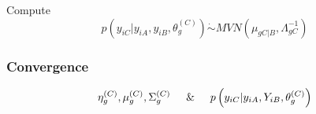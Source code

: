 \documentclass[a4paper,12pt]{article}\usepackage[]{graphicx}\usepackage[]{color}
\begin{document}
Compute
\[
p\left(y_{iC} | y_{iA}, y_{iB}, \theta_{g}^{\left(C \right)} \right) \dot{\sim} MVN\left(\mu_{gC|B},\Lambda_{gC}^{-1} \right)
\]
\subsubsection*{Convergence}

\[
\eta_{g}^{\left(C \right)}, \mu_{g}^{\left(C \right)}, \Sigma_{g}^{\left(C \right)}  \hspace{5mm} \&  \hspace{5mm} p\left( y_{iC}| y_{iA}, Y_{iB},\theta_{g}^{\left(C \right)}\right)
\]
\noindent{}

\clearpage
\end{document}
